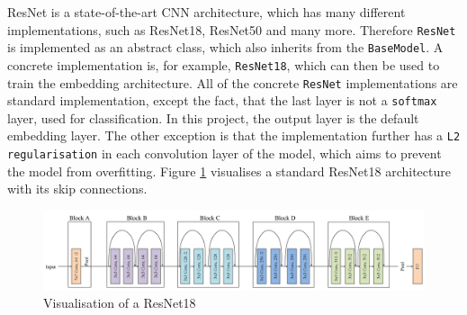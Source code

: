 \newline
ResNet is a state-of-the-art \gls{CNN} architecture, which has many different implementations, such as ResNet18, ResNet50 and many more. Therefore \texttt{ResNet} is implemented as an abstract class, which also inherits from the \texttt{BaseModel}. A concrete implementation is, for example, \texttt{ResNet18}, which can then be used to train the embedding architecture. All of the concrete \texttt{ResNet} implementations are standard implementation, except the fact, that the last layer is not a \texttt{softmax} layer, used for classification. In this project, the output layer is the default embedding layer. The other exception is that the implementation further has a \texttt{L2 regularisation} in each convolution layer of the model, which aims to prevent the model from overfitting. Figure \ref{fig:ResNet18} visualises a standard ResNet18 architecture with its skip connections.
\begin{figure}[htbp]
	\centering
	\includegraphics[width=\linewidth]{baa-documentation/img/ResNet18.png}
	\caption[Visualisation of a ResNet18]{Visualisation of a ResNet18 \footnotemark}
	\label{fig:ResNet18}
\end{figure}

